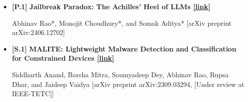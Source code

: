 \documentclass[11pt,letterpaper]{article}
\begin{document}
\begin{itemize}[leftmargin=*,label={},itemsep=4pt]
       
    \item {\color{maincolor}\textbf{[P.1]}} \textbf{Jailbreak Paradox: The Achilles' Heel of LLMs \href{https://arxiv.org/abs/2406.12702}{[link]}}  
          
        Abhinav Rao*, Monojit Choudhury*, and Somak Aditya*
        [arXiv preprint arXiv:2406.12702]
    
       
    \item {\color{maincolor}\textbf{[S.1]}} \textbf{MALITE: Lightweight Malware Detection and Classification for Constrained Devices \href{https://arxiv.org/abs/2309.03294}{[link]}}  
          
        Siddharth Anand, Barsha Mitra, Soumyadeep Dey, Abhinav Rao, Rupsa Dhar, and Jaideep Vaidya
        [arXiv preprint arXiv:2309.03294, [Under review at IEEE-TETC]]
    
       
\end{itemize}
\end{document}
